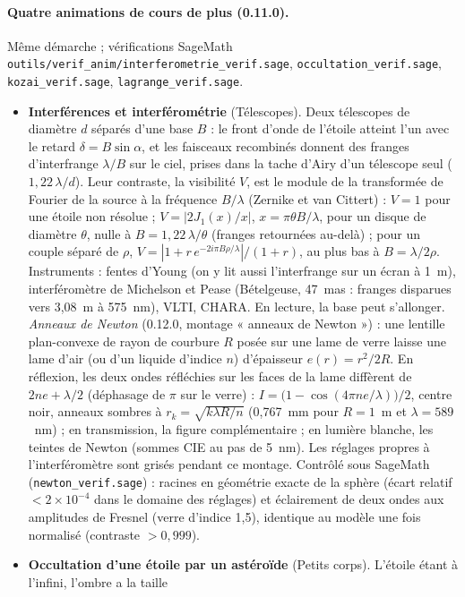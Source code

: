 \paragraph{Quatre animations de cours de plus (0.11.0).} Même démarche ; vérifications SageMath
\texttt{outils/verif\_anim/interferometrie\_verif.sage}, \texttt{occultation\_verif.sage}, \texttt{kozai\_verif.sage},
\texttt{lagrange\_verif.sage}.
\begin{itemize}
\item \textbf{Interférences et interférométrie} (Télescopes). Deux télescopes de diamètre $d$ séparés d'une base $B$ :
le front d'onde de l'étoile atteint l'un avec le retard $\delta=B\sin\alpha$, et les faisceaux recombinés donnent des
franges d'interfrange $\lambda/B$ sur le ciel, prises dans la tache d'Airy d'un télescope seul ($1{,}22\,\lambda/d$).
Leur contraste, la visibilité $V$, est le module de la transformée de Fourier de la source à la fréquence $B/\lambda$
(Zernike et van Cittert) : $V=1$ pour une étoile non résolue ; $V=|2J_1(x)/x|$, $x=\pi\theta B/\lambda$, pour un
disque de diamètre $\theta$, nulle à $B=1{,}22\,\lambda/\theta$ (franges retournées au-delà) ; pour un couple séparé de
$\rho$, $V=|1+r\,e^{-2i\pi B\rho/\lambda}|/(1+r)$, au plus bas à $B=\lambda/2\rho$. Instruments : fentes d'Young (on y lit
aussi l'interfrange sur un écran à 1~m), interféromètre de Michelson et Pease (Bételgeuse, 47~mas : franges disparues
vers 3,08~m à 575~nm), VLTI, CHARA. En lecture, la base peut s'allonger.
\emph{Anneaux de Newton} (0.12.0, montage « anneaux de Newton ») : une lentille plan-convexe de rayon de courbure $R$
posée sur une lame de verre laisse une lame d'air (ou d'un liquide d'indice $n$) d'épaisseur $e(r)=r^2/2R$. En
réflexion, les deux ondes réfléchies sur les faces de la lame diffèrent de $2ne+\lambda/2$ (déphasage de $\pi$ sur le
verre) : $I=\bigl(1-\cos(4\pi ne/\lambda)\bigr)/2$, centre noir, anneaux sombres à $r_k=\sqrt{k\lambda R/n}$ (0,767~mm
pour $R=1$~m et $\lambda=589$~nm) ; en transmission, la figure complémentaire ; en lumière blanche, les teintes de
Newton (sommes CIE au pas de 5~nm). Les réglages propres à l'interféromètre sont grisés pendant ce montage. Contrôlé sous SageMath
(\texttt{newton\_verif.sage}) : racines en géométrie exacte de la sphère (écart relatif $<2\times10^{-4}$ dans le
domaine des réglages) et éclairement de deux ondes aux amplitudes de Fresnel (verre d'indice 1,5), identique au
modèle une fois normalisé (contraste $>0{,}999$).
\item \textbf{Occultation d'une étoile par un astéroïde} (Petits corps). L'étoile étant à l'infini, l'ombre a la taille

\end{itemize}

